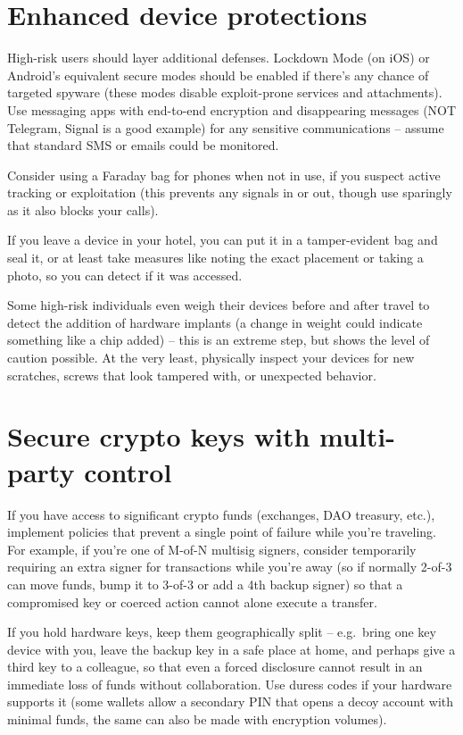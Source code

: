 \section{Enhanced device protections}

High-risk users should layer additional defenses. Lockdown
Mode (on iOS) or Android's equivalent secure modes should
be enabled if there's any chance of targeted spyware
(these modes disable exploit-prone services and
attachments). Use messaging apps with end-to-end
encryption and disappearing messages (NOT Telegram, Signal
is a good example) for any sensitive communications --
assume that standard SMS or emails could be monitored.

Consider using a Faraday bag for phones when not in use,
if you suspect active tracking or exploitation (this
prevents any signals in or out, though use sparingly as it
also blocks your calls).

If you leave a device in your hotel, you can put it in a
tamper-evident bag and seal it, or at least take measures
like noting the exact placement or taking a photo, so you
can detect if it was accessed.

Some high-risk individuals even weigh their devices before
and after travel to detect the addition of hardware
implants (a change in weight could indicate something like
a chip added) -- this is an extreme step, but shows the
level of caution possible. At the very least, physically
inspect your devices for new scratches, screws that look
tampered with, or unexpected behavior.

\section{Secure crypto keys with multi-party control}

If you have access to significant crypto funds (exchanges,
DAO treasury, etc.), implement policies that prevent a
single point of failure while you're traveling. For
example, if you're one of M-of-N multisig signers,
consider temporarily requiring an extra signer for
transactions while you're away (so if normally 2-of-3 can
move funds, bump it to 3-of-3 or add a 4th backup signer)
so that a compromised key or coerced action cannot alone
execute a transfer.

If you hold hardware keys, keep them geographically split
-- e.g.\ bring one key device with you, leave the backup
key in a safe place at home, and perhaps give a third key
to a colleague, so that even a forced disclosure cannot
result in an immediate loss of funds without
collaboration. Use duress codes if your hardware supports
it (some wallets allow a secondary PIN that opens a decoy
account with minimal funds, the same can also be made with
encryption volumes).

